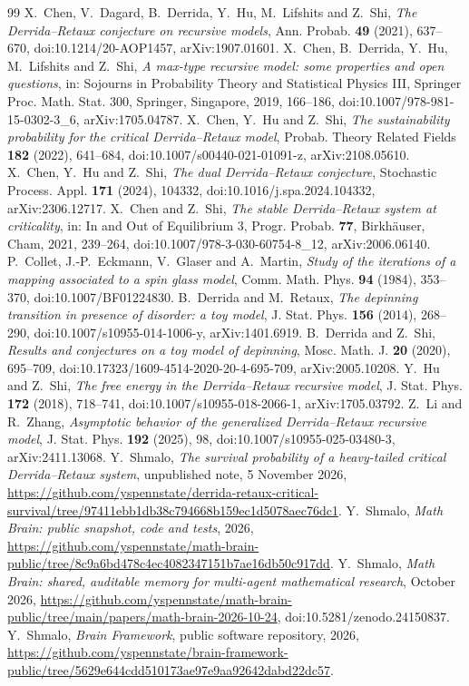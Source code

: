 \documentclass[11pt]{amsart}
\theoremstyle{remark}
\numberwithin{equation}{section}
\begin{document}
\begin{thebibliography}{99}
 X.~Chen, V.~Dagard, B.~Derrida, Y.~Hu, M.~Lifshits and Z.~Shi, \emph{The Derrida--Retaux conjecture on recursive models}, Ann. Probab. \textbf{49} (2021), 637--670, doi:10.1214/20-AOP1457, arXiv:1907.01601.
 X.~Chen, B.~Derrida, Y.~Hu, M.~Lifshits and Z.~Shi, \emph{A max-type recursive model: some properties and open questions}, in: Sojourns in Probability Theory and Statistical Physics III, Springer Proc. Math. Stat. 300, Springer, Singapore, 2019, 166--186, doi:10.1007/978-981-15-0302-3\_6, arXiv:1705.04787.
 X.~Chen, Y.~Hu and Z.~Shi, \emph{The sustainability probability for the critical Derrida--Retaux model}, Probab. Theory Related Fields \textbf{182} (2022), 641--684, doi:10.1007/s00440-021-01091-z, arXiv:2108.05610.
 X.~Chen, Y.~Hu and Z.~Shi, \emph{The dual Derrida--Retaux conjecture}, Stochastic Process. Appl. \textbf{171} (2024), 104332, doi:10.1016/j.spa.2024.104332, arXiv:2306.12717.
 X.~Chen and Z.~Shi, \emph{The stable Derrida--Retaux system at criticality}, in: In and Out of Equilibrium 3, Progr. Probab. \textbf{77}, Birkh\"auser, Cham, 2021, 239--264, doi:10.1007/978-3-030-60754-8\_12, arXiv:2006.06140.
 P.~Collet, J.-P.~Eckmann, V.~Glaser and A.~Martin, \emph{Study of the iterations of a mapping associated to a spin glass model}, Comm. Math. Phys. \textbf{94} (1984), 353--370, doi:10.1007/BF01224830.
 B.~Derrida and M.~Retaux, \emph{The depinning transition in presence of disorder: a toy model}, J. Stat. Phys. \textbf{156} (2014), 268--290, doi:10.1007/s10955-014-1006-y, arXiv:1401.6919.
 B.~Derrida and Z.~Shi, \emph{Results and conjectures on a toy model of depinning}, Mosc. Math. J. \textbf{20} (2020), 695--709, doi:10.17323/1609-4514-2020-20-4-695-709, arXiv:2005.10208.
 Y.~Hu and Z.~Shi, \emph{The free energy in the Derrida--Retaux recursive model}, J. Stat. Phys. \textbf{172} (2018), 718--741, doi:10.1007/s10955-018-2066-1, arXiv:1705.03792.
 Z.~Li and R.~Zhang, \emph{Asymptotic behavior of the generalized Derrida--Retaux recursive model}, J. Stat. Phys. \textbf{192} (2025), 98, doi:10.1007/s10955-025-03480-3, arXiv:2411.13068.
 Y.~Shmalo, \emph{The survival probability of a heavy-tailed critical Derrida--Retaux system}, unpublished note, 5 November 2026, \url{https://github.com/yspennstate/derrida-retaux-critical-survival/tree/97411ebb1db38c794668b159ec1d5078aec76dc1}.
 Y.~Shmalo, \emph{Math Brain: public snapshot, code and tests}, 2026, \url{https://github.com/yspennstate/math-brain-public/tree/8c9a6bd478c4ec4082347151b7ae16db50c917dd}.
 Y.~Shmalo, \emph{Math Brain: shared, auditable memory for multi-agent mathematical research}, October 2026, \url{https://github.com/yspennstate/math-brain-public/tree/main/papers/math-brain-2026-10-24}, doi:10.5281/zenodo.24150837.
 Y.~Shmalo, \emph{Brain Framework}, public software repository, 2026, \url{https://github.com/yspennstate/brain-framework-public/tree/5629e644cdd510173ae97e9aa92642dabd22dc57}.
\end{thebibliography}
\end{document}
